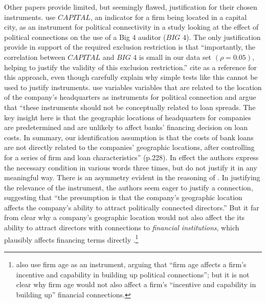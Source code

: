 \documentclass[11pt]{amsart}
\begin{document}
Other papers provide limited, but seemingly flawed, justification for their chosen instruments. 
 \citet{Guedhami:2013cj} use $\textit{CAPITAL}$, an indicator for a firm being located in a capital city, as an instrument for political connectivity in a study looking at the effect of political connections on the use of a Big 4 auditor ($\textit{BIG 4}$).
 The only justification \citet{Guedhami:2013cj} provide in support of the required exclusion restriction  is that ``importantly, the correlation between $\textit{CAPITAL}$ and $\textit{BIG 4}$ is small in our data set $(\rho = 0.05)$, helping to justify the validity of this exclusion restriction.''
 \citet{Guedhami:2013cj} cite \citet{Larcker:2010fq} as a reference for this approach, even though \citet{Larcker:2010fq} carefully explain why simple tests like this cannot be used to justify instruments.
 \citet{Houston:2014hv} use variables variables that are related to the location of the company's headquarters as instruments for political connection and argue that ``these instruments should not be conceptually related to loan spreads. The key insight here is that the geographic locations of headquarters for companies are predetermined and are unlikely to affect banks' financing decision on loan costs. In summary, our identification assumption is that the costs of bank loans are not directly related to the companies' geographic locations, after controlling for a series of firm and loan characteristics'' (p.228). In effect the authors express the necessary condition in various words three times, but do not justify it in any meaningful way.
 There is an asymmetry evident in the reasoning of \citet{Houston:2014hv}. In justifying the relevance of the instrument, the authors seem eager to justify a connection, suggesting that ``the presumption is that the company's geographic location affects the company's ability to attract politically connected directors.'' But it far from clear why a company's geographic location would not also affect the its ability to attract directors with connections to \emph{financial institutions}, which plausibly affects financing terms directly \citep{Guner:2008tp}.\footnote{\citet{Houston:2014hv} also use firm age as an instrument, arguing that ``firm age affects a firm's incentive and capability in building up political connections''; but it is not clear why firm age would not also affect a firm's ``incentive and capability in building up'' financial connections.} 
 
\end{document}
